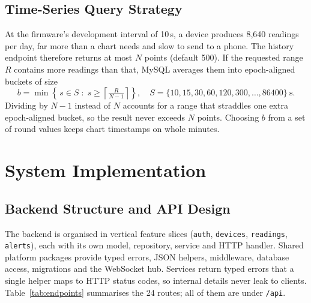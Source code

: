 \documentclass[11pt,a4paper,oneside]{report}
\newcommand{\code}[1]{\texttt{#1}}
\begin{document}
\section{Time-Series Query Strategy}
At the firmware's development interval of 10\,s, a device produces 8,640 readings per
day, far more than a chart needs and slow to send to a phone. The history endpoint
therefore returns at most $N$ points (default 500). If the requested range $R$ contains
more readings than that, MySQL averages them into epoch-aligned buckets of size
\begin{equation}
  b = \min\left\{\, s \in S \;:\; s \ge \left\lceil \tfrac{R}{N-1} \right\rceil \right\},
  \quad S = \{10, 15, 30, 60, 120, 300, \dots, 86400\}\ \text{s}.
  \label{eq:bucket}
\end{equation}
Dividing by $N-1$ instead of $N$ accounts for a range that straddles one extra
epoch-aligned bucket, so the result never exceeds $N$ points. Choosing $b$ from a set of
round values keeps chart timestamps on whole minutes.

\chapter{System Implementation}

\section{Backend Structure and API Design}
The backend is organised in vertical feature slices (\code{auth}, \code{devices},
\code{readings}, \code{alerts}), each with its own model, repository, service and HTTP
handler. Shared platform packages provide typed errors, JSON helpers, middleware,
database access, migrations and the WebSocket hub. Services return typed errors that a
single helper maps to HTTP status codes, so internal details never leak to clients.
Table~\ref{tab:endpoints} summarises the 24 routes; all of them are under \code{/api}.
\end{document}
